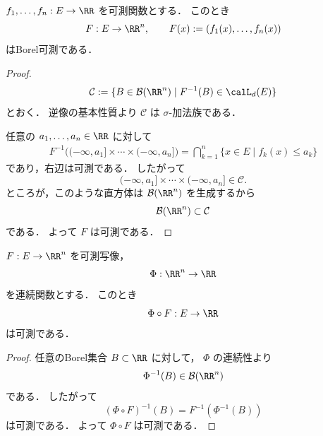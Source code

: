 \begin{proposition}[有限個の可測関数をまとめた写像]
$f_1,\dots,f_n:E\to\RR$ を可測関数とする．
このとき
\[
F:E\to\RR^n,
\qquad
F(x):=(f_1(x),\dots,f_n(x))
\]
はBorel可測である．
\end{proposition}
\begin{proof}
\[
\mathcal C:=\{B\in\mathcal B(\RR^n)\mid F^{-1}(B)\in \calL_d(E)\}
\]
とおく．
逆像の基本性質より $\mathcal C$ は $\sigma$-加法族である．

任意の $a_1,\dots,a_n\in\RR$ に対して
\begin{align*}
F^{-1}\bigl((-\infty,a_1]\times\cdots\times(-\infty,a_n]\bigr)
=
\bigcap_{k=1}^n \{x\in E\mid f_k(x)\le a_k\}
\end{align*}
であり，右辺は可測である．
したがって
\[
(-\infty,a_1]\times\cdots\times(-\infty,a_n]\in\mathcal C.
\]
ところが，このような直方体は $\mathcal B(\RR^n)$ を生成するから
\[
\mathcal B(\RR^n)\subset \mathcal C
\]
である．
よって $F$ は可測である．
\end{proof}

\begin{theorem}[連続写像との合成]
$F:E\to\RR^n$ を可測写像，
\[
\Phi:\RR^n\to\RR
\]
を連続関数とする．
このとき
\[
\Phi\circ F:E\to\RR
\]
は可測である．
\end{theorem}
\begin{proof}
任意のBorel集合 $B\subset\RR$ に対して，
$\Phi$ の連続性より
\[
\Phi^{-1}(B)\in\mathcal B(\RR^n)
\]
である．
したがって
\[
(\Phi\circ F)^{-1}(B)=F^{-1}(\Phi^{-1}(B))
\]
は可測である．
よって $\Phi\circ F$ は可測である．
\end{proof}

